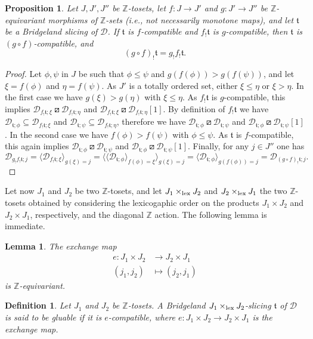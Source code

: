 \documentclass{article}
\newtheorem{prop}[thm]{Proposition}
\newtheorem{lem}[thm]{Lemma}
\newtheorem{defn}[thm]{Definition}
\theoremstyle{definition}
\newcommand{\Z}{\mathbb{Z}}
\newcommand{\tee}{\mathfrak{t}}
\newcommand{\orth}{\boxslash}
\newcommand{\lex}{\times_{\textnormal{lex}}}
\begin{document}
\begin{prop}\label{functoriality}
Let $J,J',J''$ be $\Z$-tosets, let $f\colon J\to J'$ and $g\colon J'\to J''$ be $\Z$-equivariant morphisms of $\Z$-sets (i.e., not necessarily monotone maps), and let $\tee$ be a Bridgeland slicing of $\mathscr{D}$. If $\tee$ is $f$-compatible and $f_!\tee$ is $g$-compatible, then $\tee$ is $(g\circ f)$-compatible, and
\[
(g\circ f)_!\tee= g_!f_!\tee.
\]
\end{prop}
\begin{proof}
Let $\phi,\psi$ in $J$ be such that $\phi\leq \psi$ and $g(f(\phi))>g(f(\psi))$, and let $\xi=f(\phi)$ and $\eta=f(\psi)$. As $J'$ is a totally ordered set, either $\xi\leq \eta$ or $\xi>\eta$. In the first case we have $g(\xi)>g(\eta)$ with $\xi\leq \eta$. As $f_!\tee$ is $g$-compatible, this implies $\mathscr{D}_{f_!\tee; \xi}\orth \mathscr{D}_{f_!\tee;\eta}$ and $\mathscr{D}_{f_!\tee; \xi}\orth \mathscr{D}_{f_!\tee;\eta}[1]$. By definition of $f_!\tee$ we have $\mathscr{D}_{\tee; \phi}\subseteq \mathscr{D}_{f_!\tee; \xi}$ and $\mathscr{D}_{\tee; \psi}\subseteq \mathscr{D}_{f_!\tee; \eta}$, therefore we have $\mathscr{D}_{\tee; \phi}\orth \mathscr{D}_{\tee;\psi}$ and $\mathscr{D}_{\tee; \phi}\orth \mathscr{D}_{\tee;\psi}[1]$. In the second case we have $f(\phi)>f(\psi)$ with $\phi\leq \psi$. As $\tee$ is $f$-compatible, this again
implies $\mathscr{D}_{\tee; \phi}\orth \mathscr{D}_{\tee;\psi}$ and $\mathscr{D}_{\tee; \phi}\orth \mathscr{D}_{\tee;\psi}[1]$. Finally, for any $j\in J''$ one has
\[
\mathscr{D}_{g_!f_!\tee;j}=\langle \mathscr{D}_{f_!\tee;\xi}\rangle_{g(\xi)=j}=\langle\langle \mathscr{D}_{\tee;\phi}\rangle_{f(\phi)=\xi}\rangle_{g(\xi)=j}=\langle \mathscr{D}_{\tee;\phi}\rangle_{g(f(\phi))=j}=\mathscr{D}_{(g\circ f)_!\tee;j}.
\]
\end{proof}

Let now $J_1$ and $J_2$ be two $\mathbb{Z}$-tosets, and let $J_1 \lex J_2$ and $J_2 \lex J_1$ the two $\Z$-tosets obtained by considering the lexicogaphic order on the products $J_1\times J_2$ and $J_2\times J_1$, respectively, and the diagonal $\Z$ action. The following lemma is immediate.
\begin{lem}\label{exchange}
The exchange map
\begin{align*}
e\colon J_1\times J_2&\to J_2\times J_1\\
(j_1,j_2)&\mapsto (j_2,j_1)
\end{align*}
is $\Z$-equivariant.
\end{lem}

\begin{defn}\label{gluable}
Let $J_1$ and $J_2$ be $\Z$-tosets. A Bridgeland $J_1 \lex J_2$-slicing $\tee$ of $\mathscr{D}$ is said to be \emph{gluable} if it is $e$-compatible, where $e \colon J_1 \times J_2 \to J_2 \times J_1$ is the exchange map. 
\end{defn}
\end{document}

